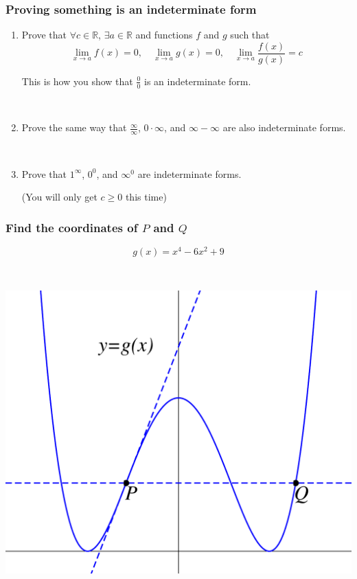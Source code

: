 \documentclass[14pt]{beamer}
\newcommand {\DS} [1] {${\displaystyle #1}$}
\newcommand {\R}{\mathbb{R}}
\newcommand{\p}{\pause}
\newcommand{\setsize}[1]{\fontsize{#1}{#1}\selectfont} %
\newcommand{\smallerfont}{\setsize{13}} %
\begin{document}
\begin{frame}[t]
\smallerfont
\frametitle{Proving something is an indeterminate form}

\begin{enumerate}

\item
Prove that  \DS{\forall c \in \R},  \DS{\exists a \in \R} and functions $f$ and $g$ such that
	$$
		\lim_{x \to a} f(x) = 0, \quad \lim_{x \to a} g(x) =0, \quad \lim_{x \to a}\frac{f(x)}{g(x)} = c
	$$

This is how you show that \DS{\frac 00} is an indeterminate form.

\ \p
\item  Prove the same way that \DS{\frac{\infty}{\infty}}, \DS{0 \cdot \infty}, and \DS{\infty - \infty} are also indeterminate forms.

\ \p
\item Prove that \DS{1^{\infty}}, \DS{0^0}, and \DS{\infty^0} are indeterminate forms.

(You will only get $c \geq 0$ this time)

\end{enumerate}

\end{frame}
\begin{frame}[t]
\frametitle{Find the coordinates of $P$ and $Q$}
\vspace{-.5cm}
$$
	 g(x) = x^4 - 6x^2 + 9
$$

\

\begin{center}
\includegraphics[scale=.4]{G16}
\end{center}

\end{frame}
\end{document}
